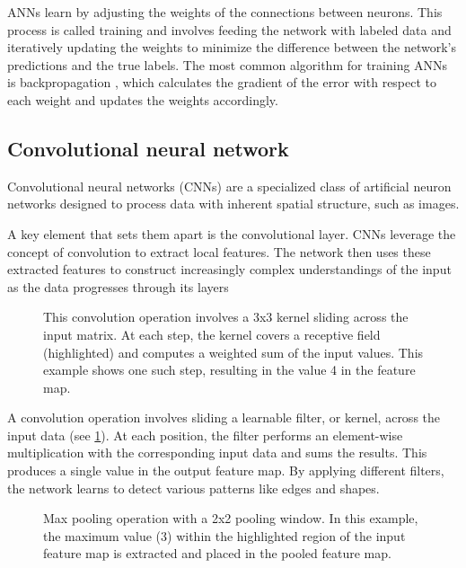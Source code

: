 ANNs learn by adjusting the weights of the connections between neurons.
This process is called training and involves feeding the network with labeled data and iteratively updating the weights to minimize the difference between the network's predictions and the true labels.
The most common algorithm for training ANNs is backpropagation \cite{rumelhartLearningRepresentationsBackpropagating1986}, which calculates the gradient of the error with respect to each weight and updates the weights accordingly.

\subsection{Convolutional neural network}
Convolutional neural networks (CNNs) are a specialized class of artificial neuron networks designed to process data with inherent spatial structure, such as images.

A key element that sets them apart is the convolutional layer.
CNNs leverage the concept of convolution to extract local features.
The network then uses these extracted features to construct increasingly complex understandings of the input as the data progresses through its layers

\begin{figure}[hbtp]
    \centering    
    
    \caption{
        This convolution operation involves a 3x3 kernel sliding across the input matrix.
        At each step, the kernel covers a receptive field (highlighted) and computes a weighted sum of the input values.
        This example shows one such step, resulting in the value 4 in the feature map.
    }
    \label{fig:2dconv}
\end{figure}

A convolution operation involves sliding a learnable filter, or kernel, across the input data (see \cref{fig:2dconv}).
At each position, the filter performs an element-wise multiplication with the corresponding input data and sums the results.
This produces a single value in the output feature map.
By applying different filters, the network learns to detect various patterns like edges and shapes.

\begin{figure}[hbtp]
    \centering    
    
    \caption{
        Max pooling operation with a 2x2 pooling window.
        In this example, the maximum value (3) within the highlighted region of the input feature map is extracted and placed in the pooled feature map.
    }
    \label{fig:maxpooling}
\end{figure}

